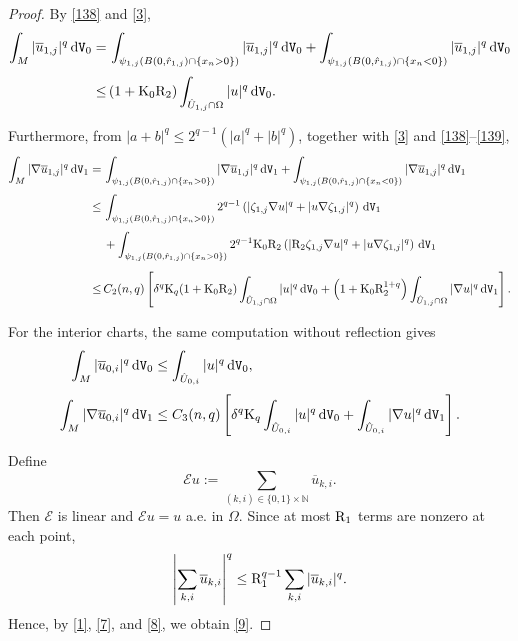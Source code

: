 \documentclass[reqno, 11pt, a4paper]{amsart}
\numberwithin{equation}{section}
\newcommand{\ck}{\textnormal K}
\newcommand{\dwv}{\textnormal{d} \mathtt{V}}
\newcommand{\rd}{\textnormal{R}}
\newcommand{\qxp}{q}
\begin{document}
\begin{proof}
By \ref{138} and \ref{3},
\begin{align}
\int_M|\overline u_{1,j}|^{\qxp}\,\dwv_0
=&\,\displaystyle\int_{\psi_{1,j}(B(0,\hat r_{1,j})\cap\{x_n>0\})}|\overline u_{1,j}|^{\qxp}\,\dwv_0
+\int_{\psi_{1,j}(B(0,\hat r_{1,j})\cap\{x_n<0\})}|\overline u_{1,j}|^{\qxp}\,\dwv_0\nonumber\\[3pt]
\leq&\,\displaystyle(1+\ck_0\rd_2)\int_{\hat U_{1,j}\cap\Omega}|u|^{\qxp}\,\dwv_0.\label{7}
\end{align}

Furthermore, from $|a+b|^{\qxp}\leq2^{\qxp-1}(|a|^{\qxp}+|b|^{\qxp})$, together with  \ref{3} and \ref{138}--\ref{139},
\begin{align}
\int_{M}|\nabla \overline u _{1,j}|^\qxp \, \dwv _1 
= & \displaystyle \, \int _{\psi _{1,j} (B(0,\hat r  _{1,j}) \cap \{x_n >0\})} |\nabla \overline u _{1,j}|^\qxp \, \dwv _1 + \int _{\psi _{1,j} (B(0,\hat r  _{1,j}) \cap \{x_n < 0\})} |\nabla \overline u _{1,j}|^\qxp \, \dwv _1 \nonumber\\[3pt]
 \leq & \displaystyle \,  \int _{\psi _{1,j} (B(0,\hat r  _{1,j}) \cap \{x_n >0\})} 2^{\qxp-1} \left( | \zeta _{1,j} \nabla u|^\qxp  + |u \nabla \zeta _{1,j} |^\qxp \right) \, \dwv _1  \nonumber \\[3pt]
& \displaystyle \, + \int _{\psi _{1,j} (B(0,\hat r  _{1,j}) \cap \{x_n > 0\})} 2^{\qxp-1} \ck _0 \rd _2 \left( |\rd _2 \zeta _{1,j} \nabla u |^\qxp  + |u \nabla \zeta _{1,j} |^\qxp \right) \, \dwv _1 \nonumber\\[5pt]
 \leq & \displaystyle \,  C_2 (n , \qxp ) \left[\delta ^{\qxp} \ck _{\qxp} (1+ \ck _0 \rd _{2})\int_{\hat U _{1,j} \cap \Omega }|u|^\qxp \, \dwv _0 +  \left(1+ \ck _0 \rd _2 ^{1+\qxp} \right)\int_{\hat U _{1,j} \cap \Omega }|\nabla u|^\qxp \, \dwv _1 \right]. \label{8}
\end{align}

{
For the interior charts, the same computation without reflection gives
\begin{align*}
\int_M|\overline u_{0,i}|^{\qxp}\,\dwv_0
&\leq\int_{\hat U_{0,i}}|u|^{\qxp}\,\dwv_0,\\[3pt]
\int_M|\nabla\overline u_{0,i}|^{\qxp}\,\dwv_1
&\leq C_3(n,\qxp)\left[\delta^{\qxp}\ck_{\qxp}\int_{\hat U_{0,i}}|u|^{\qxp}\,\dwv_0
+\int_{\hat U_{0,i}}|\nabla u|^{\qxp}\,\dwv_1\right].
\end{align*}
}

Define
$$
\mathcal Eu:=\sum_{(k,i)\in\{0,1\}\times\mathbb N}\overline u_{k,i}.
$$
Then $\mathcal E$ is linear and $\mathcal Eu=u$ a.e. in $\Omega$. { Since at most $\rd_1$ terms are nonzero at each point,}
$$
{ \left|\sum_{k,i}\overline u_{k,i}\right|^{\qxp}\leq\rd_1^{\qxp-1}\sum_{k,i}|\overline u_{k,i}|^{\qxp}.}
$$
Hence, by \ref{1}, \eqref{7}, and \eqref{8}, we obtain \eqref{9}.
\end{proof}
\end{document}
